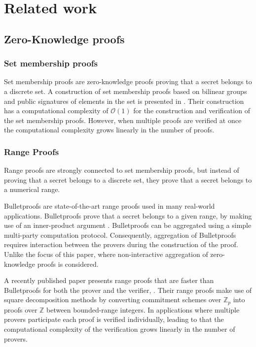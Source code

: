 \section*{Related work}

\subsection*{Zero-Knowledge proofs}

\subsubsection*{Set membership proofs}
Set membership proofs are zero-knowledge proofs proving that a secret belongs to a discrete  set. A construction of set membership proofs based on bilinear groups and public signatures of elements in the set is presented in \cite{RANGE-SET}. Their construction has a computational complexity of $\mathcal{O}(1)$ for the construction and verification of the set membership proofs. However, when multiple proofs are verified at once the computational complexity grows linearly in the number of proofs. 

\subsubsection*{Range Proofs}
Range proofs are strongly connected to set membership proofs, but instead of proving that a secret belongs to a discrete set, they prove that a secret belongs to a numerical range.

Bulletproofs are state-of-the-art range proofs used in many real-world applications. Bulletproofs prove that a secret belongs to a given range, by making use of an inner-product argument \cite{bulletProofs_theory}. Bulletproofs can be aggregated using a simple multi-party computation protocol. Consequently, aggregation of Bulletproofs requires interaction between the provers during the construction of the proof. Unlike the focus of this paper, where non-interactive aggregation of zero-knowledge proofs is considered.

A recently published paper presents range proofs that are faster than Bulletproofs for both the prover and the verifier, \cite{improveBulletproofs}. Their range proofs make use of square decomposition methods by converting commitment schemes over $\mathds{Z}_p$ into proofs over $\mathds{Z}$ between bounded-range integers. In applications where multiple provers participate each proof is verified individually, leading to that the computational complexity of the verification grows linearly in the number of provers. 


